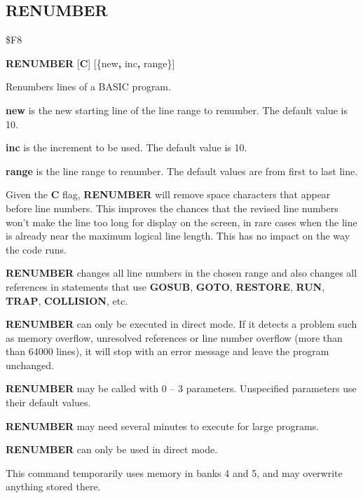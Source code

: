 \subsection{RENUMBER}
\begin{description}[leftmargin=2cm,style=nextline]
\item [Token:]    \$F8

\item [Format:]   {\bf RENUMBER} [{\bf C}] [\{new{\bf,} inc{\bf,} range\}]

\item [Usage:]    Renumbers lines of a BASIC program.

                  {\bf new} is the new starting line of the line range to renumber. The default value is 10.

                  {\bf inc} is the increment to be used. The default value is 10.

                  {\bf range} is the line range to renumber. The default values are from first to last line.

                  Given the {\bf C} flag, {\bf RENUMBER} will remove space characters that appear before line numbers. This improves the chances that the revised line numbers won't make the line too long for display on the screen, in rare cases when the line is already near the maximum logical line length. This has no impact on the way the code runs.

                  {\bf RENUMBER} changes all line numbers in the chosen range and also changes all references in statements that use {\bf GOSUB}, {\bf GOTO}, {\bf RESTORE}, {\bf RUN}, {\bf TRAP}, {\bf COLLISION}, etc.

                  {\bf RENUMBER} can only be executed in direct mode. If it detects a problem such as memory overflow, unresolved references or line number overflow (more than than 64000 lines), it will stop with an error message and leave the program unchanged.

                  {\bf RENUMBER} may be called with 0 -- 3 parameters. Unspecified parameters use their default values.

\item [Remarks:]  {\bf RENUMBER} may need several minutes to execute for large programs.
                 
                  {\bf RENUMBER} can only be used in direct mode.

                  This command temporarily uses memory in banks 4 and 5, and may overwrite anything stored there.


\end{description}
